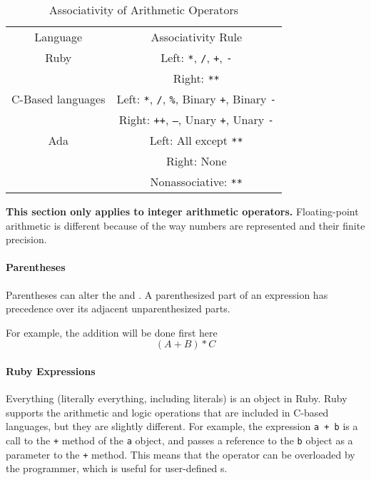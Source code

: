 \begin{table}[h!]
  \centering
  \begin{tabular}{cc}
    \toprule
    Language & Associativity Rule \\
    Ruby & Left: \texttt{*}, \texttt{/}, \texttt{+}, \texttt{-} \\
             & Right: \texttt{**} \\
    C-Based languages & Left: \texttt{*}, \texttt{/}, \texttt{\%}, Binary \texttt{+}, Binary \texttt{-} \\
             & Right: \texttt{++}, \texttt{--}, Unary \texttt{+}, Unary \texttt{-} \\
    Ada & Left: All except \texttt{**} \\
             & Right: None \\
             & Nonassociative: \texttt{**} \\
    \bottomrule
  \end{tabular}
  \caption{Associativity of Arithmetic Operators}
  \label{tab:Operator_Evaluation_order-Associativity}
\end{table}

\begin{remark*}
  \textbf{This section only applies to integer arithmetic operators.}
  Floating-point arithmetic is different because of the way numbers are represented and their finite precision.
\end{remark*}

\paragraph{Parentheses}\label{par:Operator_Evaluation_Order-Parentheses}
Parentheses can alter the  and .
A parenthesized part of an expression has precedence over its adjacent unparenthesized parts.

For example, the addition will be done first here
\begin{equation*}
  (A + B) * C
\end{equation*}

\paragraph{Ruby Expressions}\label{par:Operator_Evaluation_Order-Ruby_Expressions}
Everything (literally everything, including literals) is an object in Ruby.
Ruby supports the arithmetic and logic operations that are included in C-based languages, but they are slightly different.
For example, the expression \texttt{a + b} is a call to the \texttt{+} method of the \texttt{a} object, and passes a reference to the \texttt{b} object as a parameter to the \texttt{+} method.
This means that the operator can be overloaded by the programmer, which is useful for user-defined s.

